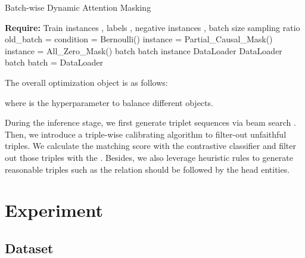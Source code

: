 \documentclass[letterpaper]{article} \usepackage{aaai21}  \usepackage{times}  \usepackage{helvet} \usepackage{courier}  \usepackage[hyphens]{url}  \usepackage{graphicx} \urlstyle{rm} \def\UrlFont{\rm}  \usepackage{natbib}  \usepackage[noend]{algpseudocode}
\begin{document}
\begin{algorithm}[th]
\begin{algorithmic}[1]
\caption{Batch-wise  Dynamic  Attention Masking} 
 \State \textbf{Require:} Train instances , labels , negative instances ,  batch size  sampling ratio 
 \While{   }
   \State old\_batch = 
    \State condition = Bernoulli()
    \State    instance = Partial\_Causal\_Mask()
     \Else
     \State   instance = All\_Zero\_Mask()
    \EndIf
    \State batch  batch   instance
    \EndFor
    \State DataLoader   DataLoader   batch
    \State batch = 
   \EndWhile
   \Return DataLoader
\label{batch} 
\end{algorithmic}
\end{algorithm}
The overall optimization object is as follows:

where  is the hyperparameter to balance different objects. 

During the inference stage, we first generate triplet sequences via beam search \cite{wiseman2016sequence}. Then, we introduce a triple-wise calibrating algorithm to filter-out unfaithful triples. We calculate the matching score with the contrastive classifier and filter out those triples with the . Besides, we also leverage heuristic rules to generate reasonable triples such as the relation should be followed by the head entities. 
\iffalse
\begin{algorithm}[th]
\begin{algorithmic}[1]
\caption{Inference with Triple-wise Calibrating} 
 \State \textbf{Require:} Test instances ,   beam  size , match threshold , prediction 
   \For{ in X}
    \State  = Autogresstive\_Generate(,)
    \State match\_score =  Contrastive\_Classify()
    \If{match\_score  }
    \State        
     \Else
     \State   continue
    \EndIf
    \EndFor
   \State return 
\label{batch} 
\end{algorithmic}
\end{algorithm}
\fi
\section{Experiment}
\subsection{Dataset}
\end{document}
